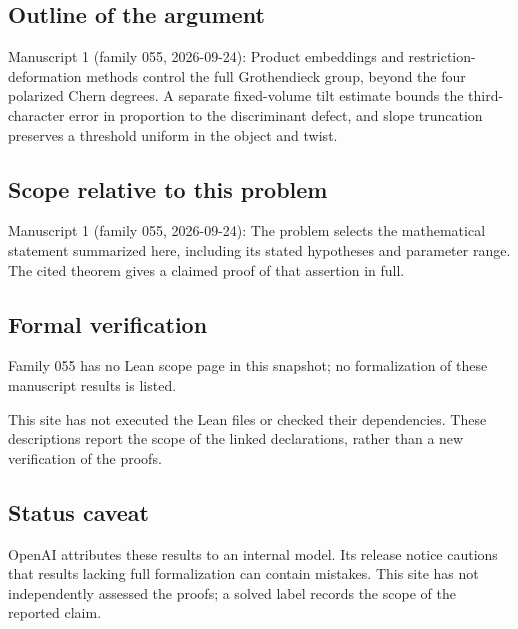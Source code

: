\documentclass[11pt]{article}
\begin{document}
\subsection{Outline of the argument}
Manuscript 1 (family 055, 2026-09-24): Product embeddings and restriction-deformation methods control the full Grothendieck group, beyond the four polarized Chern degrees. A separate fixed-volume tilt estimate bounds the third-character error in proportion to the discriminant defect, and slope truncation preserves a threshold uniform in the object and twist.

\subsection{Scope relative to this problem}
Manuscript 1 (family 055, 2026-09-24): The problem selects the mathematical statement summarized here, including its stated hypotheses and parameter range. The cited theorem gives a claimed proof of that assertion in full.

\subsection{Formal verification}
Family 055 has no Lean scope page in this snapshot; no formalization of these manuscript results is listed.

This site has not executed the Lean files or checked their dependencies. These descriptions report the scope of the linked declarations, rather than a new verification of the proofs.

\subsection{Status caveat}
OpenAI attributes these results to an internal model. Its release notice cautions that results lacking full formalization can contain mistakes. This site has not independently assessed the proofs; a solved label records the scope of the reported claim.
\end{document}
